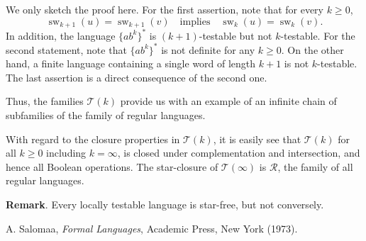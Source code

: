 \documentclass[12pt]{article}
\begin{document}
We only sketch the proof here.  For the first assertion, note that for every $k\ge 0$, $$\operatorname{sw}_{k+1}(u)=\operatorname{sw}_{k+1}(v)\quad\mbox{implies}\quad \operatorname{sw}_k(u)=\operatorname{sw}_k(v).$$  In addition, the language $\lbrace ab^k\rbrace^*$ is $(k+1)$-testable but not $k$-testable.  For the second statement, note that $\lbrace ab^k\rbrace^*$ is not definite for any $k\ge 0$.  On the other hand, a finite language containing a single word of length $k+1$ is not $k$-testable.  The last assertion is a direct consequence of the second one.

Thus, the families $\mathscr{T}(k)$ provide us with an example of an infinite chain of subfamilies of the family of regular languages.

With regard to the closure properties in $\mathscr{T}(k)$, it is easily see that $\mathscr{T}(k)$ for all $k\ge 0$ including $k=\infty$, is closed under complementation and intersection, and hence all Boolean operations.  The star-closure of $\mathscr{T}(\infty)$ is $\mathscr{R}$, the family of all regular languages.

\textbf{Remark}.  Every locally testable language is star-free, but not conversely.

\begin{thebibliography}{9}
 A. Salomaa, {\em Formal Languages}, Academic Press, New York (1973).
\end{thebibliography}
\end{document}
